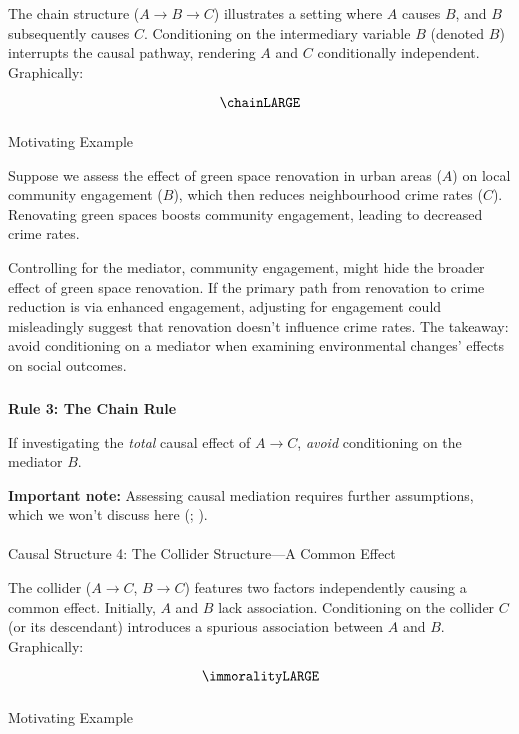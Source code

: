 \documentclass[
  singlecolumn]{article}
\makeatletter
\let\oldparagraph\paragraph
\renewcommand{\paragraph}{
    \@ifstar
      \xxxParagraphStar
      \xxxParagraphNoStar
  }
\newcommand{\xxxParagraphStar}[1]{\oldparagraph*{#1}\mbox{}}
\newcommand{\xxxParagraphNoStar}[1]{\oldparagraph{#1}\mbox{}}
\let\oldsubparagraph\subparagraph
\renewcommand{\subparagraph}{
    \@ifstar
      \xxxSubParagraphStar
      \xxxSubParagraphNoStar
  }
\newcommand{\xxxSubParagraphStar}[1]{\oldsubparagraph*{#1}\mbox{}}
\newcommand{\xxxSubParagraphNoStar}[1]{\oldsubparagraph{#1}\mbox{}}
\makeatother
\begin{document}
The chain structure (\(A \rightarrow B \rightarrow C\)) illustrates a
setting where \(A\) causes \(B\), and \(B\) subsequently causes \(C\).
Conditioning on the intermediary variable \(B\) (denoted \(\boxed{B}\))
interrupts the causal pathway, rendering \(A\) and \(C\) conditionally
independent. Graphically:

\[
\chainLARGE
\]

\subparagraph{Motivating Example}\label{motivating-example-2}

Suppose we assess the effect of green space renovation in urban areas
(\(A\)) on local community engagement (\(B\)), which then reduces
neighbourhood crime rates (\(C\)). Renovating green spaces boosts
community engagement, leading to decreased crime rates.

Controlling for the mediator, community engagement, might hide the
broader effect of green space renovation. If the primary path from
renovation to crime reduction is via enhanced engagement, adjusting for
engagement could misleadingly suggest that renovation doesn't influence
crime rates. The takeaway: avoid conditioning on a mediator when
examining environmental changes' effects on social outcomes.

\subparagraph{\texorpdfstring{\textbf{Rule 3: The Chain
Rule}}{Rule 3: The Chain Rule}}\label{rule-3-the-chain-rule}

If investigating the \emph{total} causal effect of \(A \to C\),
\emph{avoid} conditioning on the mediator \(B\).

\textbf{Important note:} Assessing causal mediation requires further
assumptions, which we won't discuss here
(;
).

\paragraph{Causal Structure 4: The Collider Structure---A Common
Effect}\label{causal-structure-4-the-collider-structurea-common-effect}

The collider (\(A \to C\), \(B \to C\)) features two factors
independently causing a common effect. Initially, \(A\) and \(B\) lack
association. Conditioning on the collider \(C\) (or its descendant)
introduces a spurious association between \(A\) and \(B\). Graphically:

\[
\immoralityLARGE
\]

\subparagraph{Motivating Example}\label{motivating-example-3}
\end{document}
